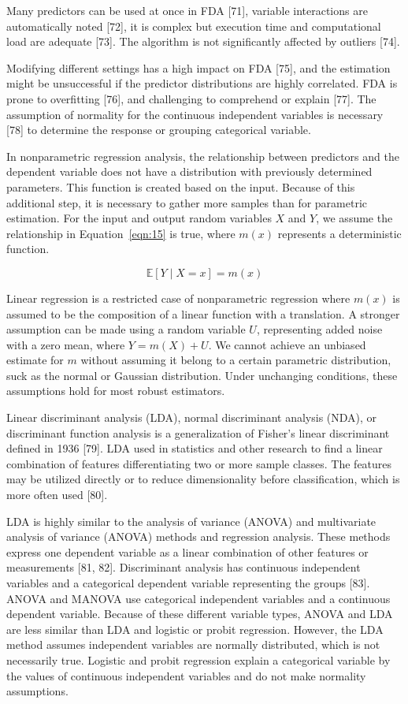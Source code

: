 \documentclass[preprint,12pt]{elsarticle}
\begin{document}
Many predictors can be used at once in FDA [71], variable interactions are automatically noted [72], it is complex but execution time and computational load are adequate [73]. The algorithm is not significantly affected by outliers [74].

Modifying different settings has a high impact on FDA [75], and the estimation might be unsuccessful if the predictor distributions are highly correlated. FDA is prone to overfitting [76], and challenging to comprehend or explain [77]. The assumption of normality for the continuous independent variables is necessary [78] to determine the response or grouping categorical variable. 

In nonparametric regression analysis, the relationship between predictors and the dependent variable does not have a distribution with previously determined parameters. This function is created based on the input. Because of this additional step, it is necessary to gather more samples than for parametric estimation. For the input and output random variables $X$ and $Y$, we assume the relationship in Equation~\ref{eqn:15} is true, where $m\left(x\right)$ represents a deterministic function.

\begin{equation}
	\mathbb{E}[Y\mid X=x]=m\left(x\right)
	\label{eqn:15}
\end{equation}

Linear regression is a restricted case of nonparametric regression where $m\left(x\right)$ is assumed to be the composition of a linear function with a translation. A stronger assumption can be made using a random variable $U$, representing added noise with a zero mean, where $Y=m\left(X\right)+U$. We cannot achieve an unbiased estimate for $m$ without assuming it belong to a certain parametric distribution, suck as the normal or Gaussian distribution. Under unchanging conditions, these assumptions hold for most robust estimators.

Linear discriminant analysis (LDA), normal discriminant analysis (NDA), or discriminant function analysis is a generalization of Fisher's linear discriminant defined in 1936 [79]. LDA used in statistics and other research to find a linear combination of features differentiating two or more sample classes. The features may be utilized directly or to reduce dimensionality before classification, which is more often used [80].

LDA is highly similar to the analysis of variance (ANOVA) and multivariate analysis of variance (ANOVA) methods and regression analysis. These methods express one dependent variable as a linear combination of other features or measurements [81, 82]. Discriminant analysis has continuous independent variables and a categorical dependent variable representing the groups [83]. ANOVA and MANOVA use categorical independent variables and a continuous dependent variable. Because of these different variable types, ANOVA and LDA are less similar than LDA and logistic or probit regression. However, the LDA method assumes independent variables are normally distributed, which is not necessarily true. Logistic and probit regression explain a categorical variable by the values of continuous independent variables and do not make normality assumptions.
\end{document}
